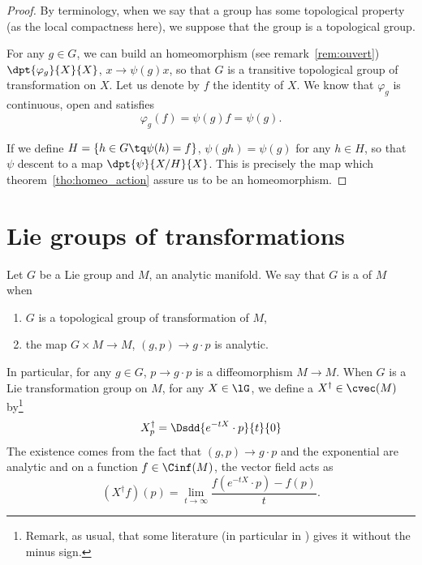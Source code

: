 \begin{proof}
	By terminology, when we say that a group has some topological property (as the local compactness here), we suppose that the group is a topological group.

	For any $g\in G$, we can build an homeomorphism (see remark~\ref{rem:ouvert}) $\dpt{\varphi_g}{X}{X}$, $x\to \psi(g)x$, so that $G$ is  a transitive topological group of transformation on $X$. Let us denote by $f$ the identity of $X$. We know that $\varphi_g$ is continuous, open and satisfies
	\[
		\varphi_g(f)=\psi(g)f=\psi(g).
	\]

	If we define $H=\{h\in G\tq \psi(h)=f\}$, $\psi(gh)=\psi(g)$ for any $h\in H$, so that $\psi$ descent to a map $\dpt{\psi}{X/H}{X}$. This is precisely the map which theorem~\ref{tho:homeo_action} assure us to be an homeomorphism.

\end{proof}

\section{Lie groups of transformations}

\begin{definition}
	Let $G$ be a Lie group and $M$, an analytic manifold. We say that $G$ is a  of $M$ when

	\begin{enumerate}
		\item $G$ is a topological group of transformation of $M$,
		\item the map $G\times M\to M$, $(g,p)\to g\cdot p$ is analytic.
	\end{enumerate}
	\label{DefLieGpTransfo}
\end{definition}

In particular, for any $g\in G$, $p\to g\cdot p$ is a diffeomorphism $M\to M$. When $G$ is a Lie transformation group on $M$, for any $X\in\lG$, we define a  $X^{\dag}\in\cvec(M)$ by\footnote{Remark, as usual, that some literature (in particular in \cite{Helgason}) gives it without the minus sign.}
\begin{equation}
	X^{\dag}_p=\Dsdd{e^{-tX}\cdot p}{t}{0}
\end{equation}
The existence comes from the fact that $(g,p)\to g\cdot p$ and the exponential are analytic and on a function $f\in\Cinf(M)$, the vector field acts as
\[
	(X^{\dag} f)(p)=\lim_{t\to\infty}\frac{ f(e^{-tX}\cdot p)-f(p) }{t}.
\]

